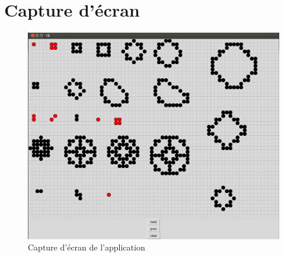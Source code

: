 \section{Capture d'écran}

\begin{figure}[H]
  \includegraphics[scale=0.50]{body/images/screenshot.png}
  \caption{Capture d'écran de l'application}
  \label{fig:screenshot}
\end{figure}

